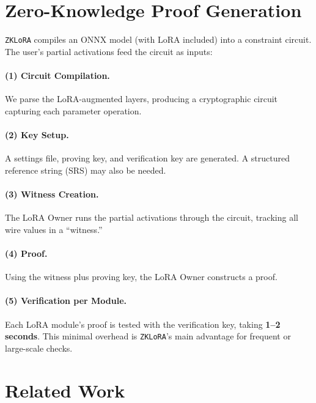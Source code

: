 \documentclass[11pt]{article}
\begin{document}
\section{Zero-Knowledge Proof Generation}

\texttt{ZKLoRA} compiles an ONNX model (with LoRA included) into a constraint circuit. The user’s partial activations feed the circuit as inputs:

\paragraph{(1) Circuit Compilation.} 
We parse the LoRA-augmented layers, producing a cryptographic circuit capturing each parameter operation. 

\paragraph{(2) Key Setup.} 
A settings file, proving key, and verification key are generated. A structured reference string (SRS) may also be needed.

\paragraph{(3) Witness Creation.}
The LoRA Owner runs the partial activations through the circuit, tracking all wire values in a “witness.” 

\paragraph{(4) Proof.}
Using the witness plus proving key, the LoRA Owner constructs a proof. 

\paragraph{(5) Verification per Module.}
Each LoRA module’s proof is tested with the verification key, taking \textbf{1--2 seconds}. This minimal overhead is \texttt{ZKLoRA}’s main advantage for frequent or large-scale checks.

\section{Related Work}
\end{document}

